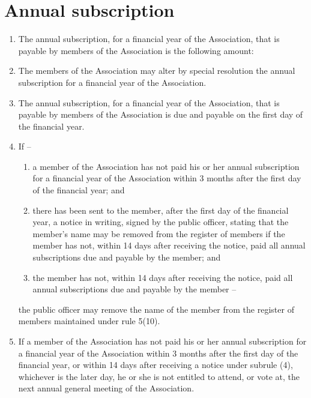\documentclass[a4paper,11pt]{article}
\begin{document}
\section{Annual subscription}
\begin{enumerate}
	\item The annual subscription, for a financial year of the Association, that is payable by members of the Association is the following amount:\\\orgAnnualFee{}
	\item The members of the Association may alter by special resolution the annual subscription for a financial year of the Association.
	\item The annual subscription, for a financial year of the Association, that is payable by members of the Association is due and payable on the first day of the financial year.
	
	\item If --
		\begin{enumerate}
			\item a member of the Association has not paid his or her annual subscription for a financial year of the Association within 3 months after the first day of the financial year; and
			\item there has been sent to the member, after the first day of the financial year, a notice in writing, signed by the public officer, stating that the member's name may be removed from the register of members if the member has not, within 14 days after receiving the notice, paid all annual subscriptions due and payable by the member; and
			\item the member has not, within 14 days after receiving the notice, paid all annual subscriptions due and payable by the member –
		\end{enumerate}	the public officer may remove the name of the member from the register of members maintained under rule 5(10).

	\item If a member of the Association has not paid his or her annual subscription for a financial year of the Association within 3 months after the first day of the financial year, or within 14 days after receiving a notice under subrule (4), whichever is the later day, he or she is not entitled to attend, or vote at, the next annual general meeting of the Association.
\end{enumerate}
\end{document}
